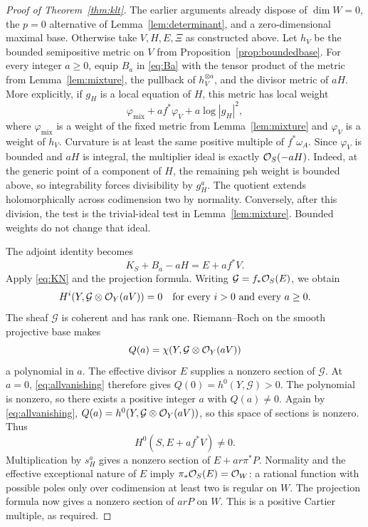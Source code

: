 \begin{proof}[Proof of Theorem~\ref{thm:klt}]
The earlier arguments already dispose of $\dim W=0$, the $p=0$ alternative of Lemma~\ref{lem:determinant}, and a zero-dimensional maximal base. Otherwise take $V,H,E,\Xi$ as constructed above. Let $h_V$ be the bounded semipositive metric on $V$ from Proposition~\ref{prop:boundedbase}. For every integer $a\ge0$, equip $B_a$ in \eqref{eq:Ba} with the tensor product of the metric from Lemma~\ref{lem:mixture}, the pullback of $h_V^{\otimes a}$, and the divisor metric of $aH$. More explicitly, if $g_H$ is a local equation of $H$, this metric has local weight
\[
\varphi_{\mathrm{mix}}+a f^*\varphi_V+a\log|g_H|^2,
\]
where $\varphi_{\mathrm{mix}}$ is a weight of the fixed metric from Lemma~\ref{lem:mixture} and $\varphi_V$ is a weight of $h_V$. Curvature is at least the same positive multiple of $f^*\omega_A$. Since $\varphi_V$ is bounded and $aH$ is integral, the multiplier ideal is exactly $\mathcal O_S(-aH)$. Indeed, at the generic point of a component of $H$, the remaining psh weight is bounded above, so integrability forces divisibility by $g_H^a$. The quotient extends holomorphically across codimension two by normality. Conversely, after this division, the test is the trivial-ideal test in Lemma~\ref{lem:mixture}. Bounded weights do not change that ideal.

The adjoint identity becomes
\[
K_S+B_a-aH=E+af^*V.
\]
Apply \eqref{eq:KN} and the projection formula. Writing $\mathcal G=f_*\mathcal O_S(E)$, we obtain
\begin{equation}\label{eq:allvanishing}
H^i(Y,\mathcal G\otimes\mathcal O_Y(aV))=0
\quad\text{for every }i>0\text{ and every }a\ge0.
\end{equation}
The sheaf $\mathcal G$ is coherent and has rank one. Riemann--Roch on the smooth projective base makes
\[
Q(a)=\chi(Y,\mathcal G\otimes\mathcal O_Y(aV))
\]
a polynomial in $a$. The effective divisor $E$ supplies a nonzero section of $\mathcal G$. At $a=0$, \eqref{eq:allvanishing} therefore gives $Q(0)=h^0(Y,\mathcal G)>0$. The polynomial is nonzero, so there exists a positive integer $a$ with $Q(a)\ne0$. Again by \eqref{eq:allvanishing}, $Q(a)=h^0(Y,\mathcal G\otimes\mathcal O_Y(aV))$, so this space of sections is nonzero. Thus
\[
H^0(S,E+af^*V)\ne0.
\]
Multiplication by $s_H^a$ gives a nonzero section of $E+ar\pi^*P$. Normality and the effective exceptional nature of $E$ imply $\pi_*\mathcal O_S(E)=\mathcal O_W$: a rational function with possible poles only over codimension at least two is regular on $W$. The projection formula now gives a nonzero section of $arP$ on $W$. This is a positive Cartier multiple, as required.
\end{proof}
